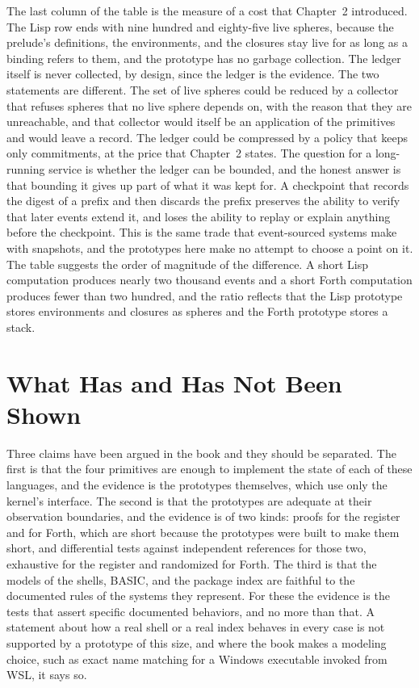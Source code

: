 The last column of the table is the measure of a cost that Chapter~2 introduced. The Lisp row ends with nine hundred and eighty-five live spheres, because the prelude's definitions, the environments, and the closures stay live for as long as a binding refers to them, and the prototype has no garbage collection. The ledger itself is never collected, by design, since the ledger is the evidence. The two statements are different. The set of live spheres could be reduced by a collector that refuses spheres that no live sphere depends on, with the reason that they are unreachable, and that collector would itself be an application of the primitives and would leave a record. The ledger could be compressed by a policy that keeps only commitments, at the price that Chapter~2 states. The question for a long-running service is whether the ledger can be bounded, and the honest answer is that bounding it gives up part of what it was kept for. A checkpoint that records the digest of a prefix and then discards the prefix preserves the ability to verify that later events extend it, and loses the ability to replay or explain anything before the checkpoint. This is the same trade that event-sourced systems make with snapshots, and the prototypes here make no attempt to choose a point on it. The table suggests the order of magnitude of the difference. A short Lisp computation produces nearly two thousand events and a short Forth computation produces fewer than two hundred, and the ratio reflects that the Lisp prototype stores environments and closures as spheres and the Forth prototype stores a stack.

\section{What Has and Has Not Been Shown}

Three claims have been argued in the book and they should be separated. The first is that the four primitives are enough to implement the state of each of these languages, and the evidence is the prototypes themselves, which use only the kernel's interface. The second is that the prototypes are adequate at their observation boundaries, and the evidence is of two kinds: proofs for the register and for Forth, which are short because the prototypes were built to make them short, and differential tests against independent references for those two, exhaustive for the register and randomized for Forth. The third is that the models of the shells, BASIC, and the package index are faithful to the documented rules of the systems they represent. For these the evidence is the tests that assert specific documented behaviors, and no more than that. A statement about how a real shell or a real index behaves in every case is not supported by a prototype of this size, and where the book makes a modeling choice, such as exact name matching for a Windows executable invoked from WSL, it says so.

